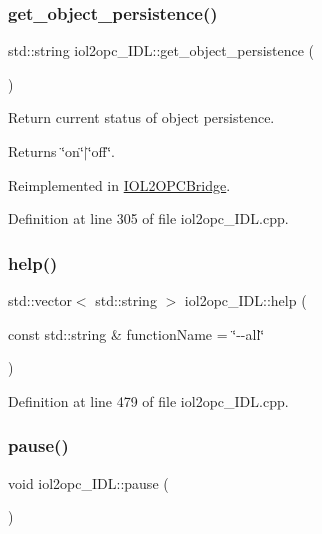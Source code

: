 \subsubsection{\texorpdfstring{get\+\_\+object\+\_\+persistence()}{get\_object\_persistence()}}
{\footnotesize\ttfamily std\+::string iol2opc\+\_\+\+I\+D\+L\+::get\+\_\+object\+\_\+persistence (\begin{DoxyParamCaption}{ }\end{DoxyParamCaption})\hspace{0.3cm}{\ttfamily [virtual]}}



Return current status of object persistence. 

\begin{DoxyReturn}{Returns}
\char`\"{}on\char`\"{}$\vert$\char`\"{}off\char`\"{}. 
\end{DoxyReturn}


Reimplemented in \hyperlink{group__iol2opc_ac5ec9c3ba20773a056a266e8d6b5daae}{I\+O\+L2\+O\+P\+C\+Bridge}.



Definition at line 305 of file iol2opc\+\_\+\+I\+D\+L.\+cpp.

\mbox{\label{classiol2opc__IDL_ab4c595b6f7371a052624190440bf6d05}} 
\subsubsection{\texorpdfstring{help()}{help()}}
{\footnotesize\ttfamily std\+::vector$<$ std\+::string $>$ iol2opc\+\_\+\+I\+D\+L\+::help (\begin{DoxyParamCaption}\item[{const std\+::string \&}]{function\+Name = {\ttfamily \char`\"{}-\/-\/all\char`\"{}} }\end{DoxyParamCaption})\hspace{0.3cm}{\ttfamily [virtual]}}



Definition at line 479 of file iol2opc\+\_\+\+I\+D\+L.\+cpp.

\mbox{\label{classiol2opc__IDL_a98bd49ef49a7600dc2d995dc165e73ce}} 
\subsubsection{\texorpdfstring{pause()}{pause()}}
{\footnotesize\ttfamily void iol2opc\+\_\+\+I\+D\+L\+::pause (\begin{DoxyParamCaption}{ }\end{DoxyParamCaption})\hspace{0.3cm}{\ttfamily [virtual]}}



